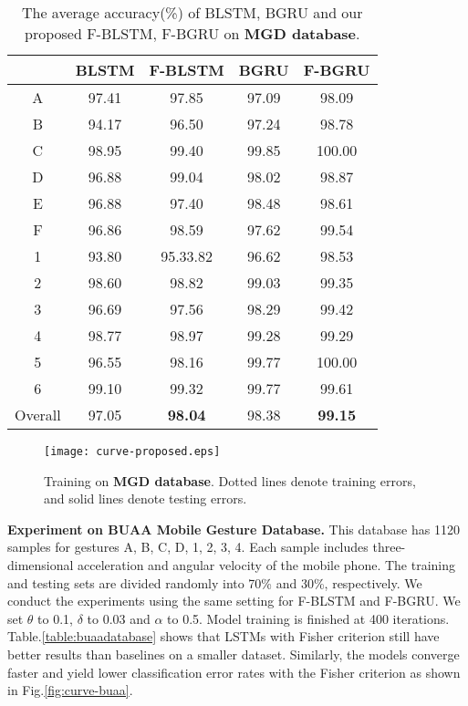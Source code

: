 \documentclass[review]{elsarticle}
\begin{document}
\begin{table*}[htp]
	\centering
	\caption{The average accuracy(\%) of BLSTM, BGRU and our proposed F-BLSTM, F-BGRU on \textbf{{MGD} database}.}
	\label{table:ourdatabase}
	\vspace*{6pt}
	\begin{tabular}{||c||c|c||c|c||}
		\hline
		\diagbox{\textbf{Gesture}}{\textbf{Method}} & BLSTM & F-BLSTM & BGRU & F-BGRU\\
		\hline
		A & 97.41 & 97.85 & 97.09 & 98.09 \\ %
		B & 94.17 & 96.50 & 97.24 & 98.78 \\ %
		C & 98.95 & 99.40 & 99.85 & 100.00 \\ %
		D & 96.88 & 99.04 & 98.02 & 98.87 \\ %
		E & 96.88 & 97.40 & 98.48 & 98.61 \\ %
		F & 96.86 & 98.59 & 97.62 & 99.54 \\ %
		1 & 93.80 & 95.33.82 & 96.62 & 98.53 \\ %
		2 & 98.60 & 98.82 & 99.03 & 99.35 \\ %
		3 & 96.69 & 97.56 & 98.29 & 99.42 \\ %
		4 & 98.77 & 98.97 & 99.28 & 99.29 \\ %
		5 & 96.55 & 98.16 & 99.77 & 100.00 \\ %
		6 & 99.10 & 99.32 & 99.77 & 99.61 \\ \hline
		Overall & 97.05 & \textbf{98.04} & 98.38 & \textbf{99.15} \\ \hline
	\end{tabular}
\end{table*}

\begin{figure*}[htbp]
	\normalsize
	\centering
	\texttt{[image: curve-proposed.eps]}
	\caption{Training on \textbf{{MGD} database}. Dotted lines denote training errors, and solid lines denote testing errors. }
	\label{fig:curve-proposed}
	\vspace*{4pt}
\end{figure*}

\textbf{Experiment on BUAA Mobile Gesture Database\;\cite{xie2016ccbr}.}
This database has 1120 samples for gestures A, B, C, D, 1, 2, 3, 4. Each sample includes three-dimensional acceleration and angular velocity of the mobile phone. The training and testing sets are divided randomly into 70\% and 30\%, respectively. We conduct the experiments using the same setting for F-BLSTM and F-BGRU. We set $\theta$ to 0.1, $\delta$ to 0.03 and $\alpha$ to 0.5. Model training is finished at 400 iterations. Table.\;\ref{table:buaadatabase} shows that LSTMs with Fisher criterion still have better results than baselines on a smaller dataset. Similarly, the models converge faster and yield lower classification error rates with the Fisher criterion as shown in Fig.\;\ref{fig:curve-buaa}.
\end{document}
